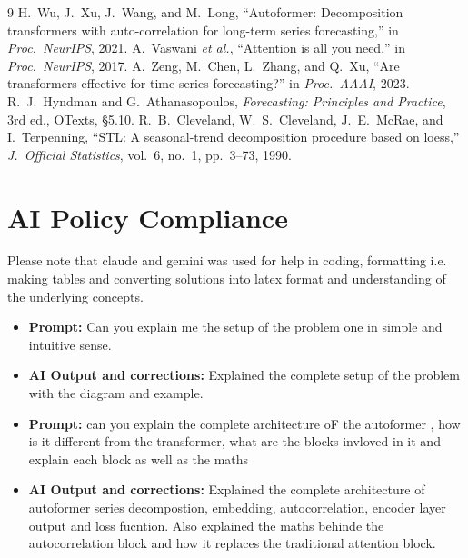 \documentclass[11pt,a4paper]{article}
\begin{document}
\begin{thebibliography}{9}
 H.~Wu, J.~Xu, J.~Wang, and M.~Long, ``Autoformer: Decomposition transformers with auto-correlation for long-term series forecasting,'' in \emph{Proc.\ NeurIPS}, 2021.
 A.~Vaswani \emph{et al.}, ``Attention is all you need,'' in \emph{Proc.\ NeurIPS}, 2017.
 A.~Zeng, M.~Chen, L.~Zhang, and Q.~Xu, ``Are transformers effective for time series forecasting?'' in \emph{Proc.\ AAAI}, 2023.
 R.~J.~Hyndman and G.~Athanasopoulos, \emph{Forecasting: Principles and Practice}, 3rd ed., OTexts, \S5.10.
 R.~B.~Cleveland, W.~S.~Cleveland, J.~E.~McRae, and I.~Terpenning, ``STL: A seasonal-trend decomposition procedure based on loess,'' \emph{J.\ Official Statistics}, vol.~6, no.~1, pp.~3--73, 1990.
\end{thebibliography}


\section{AI Policy Compliance}
Please note that claude and gemini was used for help in coding, formatting i.e. making tables and converting solutions into latex format and understanding of the underlying concepts. 

\begin{itemize}
\item\textbf{Prompt:} Can you explain me the setup of the problem one in simple and intuitive sense. \item \textbf{AI Output and corrections:} Explained the complete setup of the problem with the diagram and example.  
\end{itemize}


\begin{itemize}
\item \textbf{Prompt:} can you explain the complete architecture oF the autoformer , how is it different from the transformer, what are the blocks invloved in it and explain each block as well as the maths \item \textbf{AI Output and corrections:} Explained the complete architecture of autoformer series decompostion, embedding, autocorrelation, encoder layer output and loss fucntion. Also explained the maths behinde the autocorrelation block and how it replaces the traditional attention block. 
\end{itemize}
\end{document}
